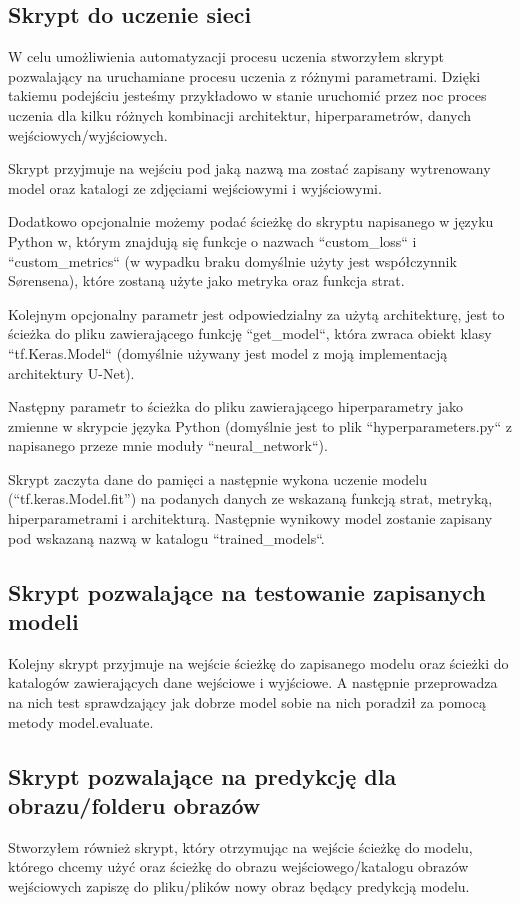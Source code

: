 \documentclass{article}
\begin{document}
\subsection{Skrypt do uczenie sieci}
W celu umożliwienia automatyzacji procesu uczenia stworzyłem skrypt pozwalający na uruchamiane procesu uczenia z różnymi parametrami.
Dzięki takiemu podejściu jesteśmy przykładowo w stanie uruchomić przez noc proces uczenia dla kilku różnych kombinacji architektur, hiperparametrów, danych wejściowych/wyjściowych.

Skrypt przyjmuje na wejściu pod jaką nazwą ma zostać zapisany wytrenowany model oraz katalogi ze zdjęciami wejściowymi i wyjściowymi.

Dodatkowo opcjonalnie możemy podać ścieżkę do skryptu napisanego w języku Python w, którym znajdują się funkcje o nazwach ``custom\_loss`` i ``custom\_metrics`` (w wypadku braku domyślnie użyty jest współczynnik Sørensena), które zostaną użyte jako metryka oraz funkcja strat.

Kolejnym opcjonalny parametr jest odpowiedzialny za użytą architekturę, jest to ścieżka do pliku zawierającego funkcję ``get\_model``, która zwraca obiekt klasy ``tf.Keras.Model`` (domyślnie używany jest model z moją implementacją architektury U-Net).

Następny parametr to ścieżka do pliku zawierającego hiperparametry jako zmienne w skrypcie języka Python (domyślnie jest to plik ``hyperparameters.py`` z napisanego przeze mnie moduły ``neural\_network``).

Skrypt zaczyta dane do pamięci a następnie wykona uczenie modelu (``tf.keras.Model.fit'') na podanych danych ze wskazaną funkcją strat, metryką, hiperparametrami i architekturą.
Następnie wynikowy model zostanie zapisany pod wskazaną nazwą w katalogu ``trained\_models``.
\subsection{Skrypt pozwalające na testowanie zapisanych modeli}
Kolejny skrypt przyjmuje na wejście ścieżkę do zapisanego modelu oraz ścieżki do katalogów zawierających dane wejściowe i wyjściowe.
A następnie przeprowadza na nich test sprawdzający jak dobrze model sobie na nich poradził za pomocą metody model.evaluate.
\subsection{Skrypt pozwalające na predykcję dla obrazu/folderu obrazów}
Stworzyłem również skrypt, który otrzymując na wejście ścieżkę do modelu, którego chcemy użyć oraz
ścieżkę do obrazu wejściowego/katalogu obrazów wejściowych zapiszę do pliku/plików nowy obraz będący predykcją modelu.
\end{document}
